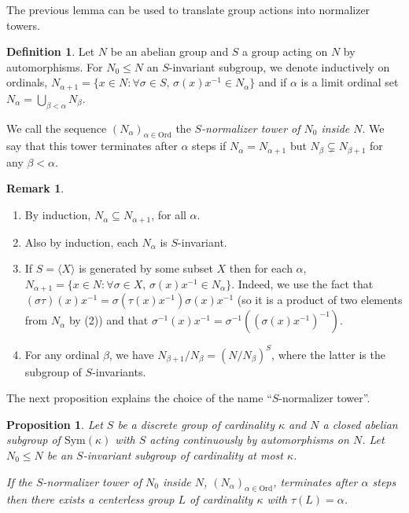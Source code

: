 \documentclass[10pt,a4paper]{amsart}
\theoremstyle{plain}
\newtheorem{proposition}[theorem]{Proposition}
\theoremstyle{definition}
\newtheorem{definition}[theorem]{Definition}
\newtheorem{remark}[theorem]{Remark}
\newcounter{step}
\begin{document}
The previous lemma can be used to translate group actions into normalizer towers. 

\begin{definition}\label{D:tower}
    Let $N$ be an abelian group and $S$ a group acting on $N$ by automorphisms. For $N_0\leq N$ an $S$-invariant subgroup, we denote inductively on ordinals, $N_{\alpha+1}=\{x\in N:\forall \sigma\in S,\,\sigma(x)x^{-1}\in N_\alpha\}$ and if $\alpha$ is a limit ordinal set $N_\alpha=\bigcup_{\beta<\alpha} N_\beta$. 

    We call the sequence $(N_\alpha)_{\alpha\in \mathrm{Ord}}$ the \emph{$S$-normalizer tower of $N_0$ inside $N$}. We say that this tower terminates after $\alpha$ steps if $N_{\alpha}=N_{\alpha+1}$ but $N_\beta\subsetneq N_{\beta+1}$ for any $\beta<\alpha$.
\end{definition}



\begin{remark}\label{R: remarks on invariants tower}
    \begin{enumerate}
        \item By induction, $N_{\alpha}\subseteq N_{\alpha+1}$, for all $\alpha$.
        \item Also by induction, each $N_\alpha$ is $S$-invariant.

        \item If $S=\langle X\rangle$ is generated by some subset $X$ then for each $\alpha$, $N_{\alpha+1}=\{x\in N:\forall \sigma\in X,\,\sigma(x)x^{-1}\in N_\alpha\}.$ Indeed, we use the fact that $(\sigma\tau)(x)x^{-1}=\sigma(\tau(x)x^{-1})\sigma(x)x^{-1}$ (so it is a product of two elements from $N_\alpha$ by (2)) and that $\sigma^{-1}(x)x^{-1}=\sigma^{-1}((\sigma(x)x^{-1})^{-1})$.
        \item For any ordinal $\beta$, we have  $N_{\beta+1}/N_\beta=(N/N_\beta)^S$, where the latter is the subgroup of $S$-invariants. 
    \end{enumerate}
\end{remark}


The next proposition explains the choice of the name ``$S$-normalizer tower''.

\begin{proposition}\label{P:from action to automorphism}
Let $S$ be a discrete group of cardinality $\kappa$ and $N$ a closed abelian subgroup of $\mathrm{Sym}(\kappa)$ with $S$ acting continuously by automorphisms on $N$. Let $N_0\leq N$ be an  $S$-invariant subgroup of cardinality at most $\kappa$. 
    
    If the $S$-normalizer tower of $N_0$ inside $N$, $(N_\alpha)_{\alpha\in \mathrm{Ord}}$, terminates after $\alpha$ steps then there exists a centerless group $L$ of cardinality $\kappa$ with $\tau(L)=\alpha$. 
\end{proposition}
\end{document}
